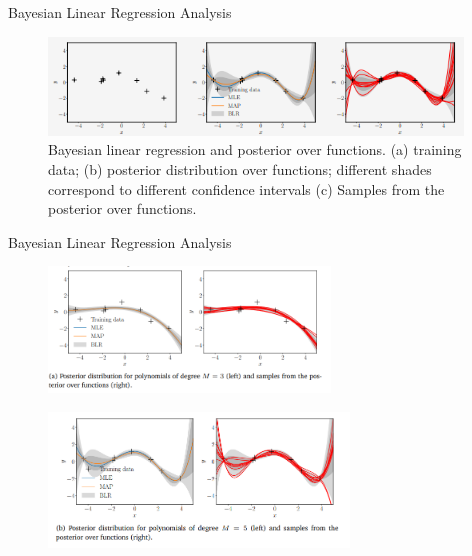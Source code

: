 \documentclass{beamer}
\begin{document}
\begin{frame}{Bayesian Linear Regression Analysis}

\begin{figure}[htp]
\centering
\includegraphics[width=11cm]{figures/blrfig1.png}
\caption{Bayesian linear regression and posterior over functions. (a) training data; (b) posterior distribution over functions; different shades correspond to different confidence intervals (c) Samples from the posterior over functions.}
\label{fig:blrfig1}
\end{figure}

\end{frame}

\begin{frame}{Bayesian Linear Regression Analysis}

\begin{figure}[htp]
\centering
\includegraphics[width=7.5cm]{figures/blr21.png}
\label{fig:blrfig21}
\end{figure}
\begin{figure}[htp]
\centering
\includegraphics[width=8cm]{figures/blr22.png}
\label{fig:blrfig22}
\end{figure}

\end{frame}
\end{document}
